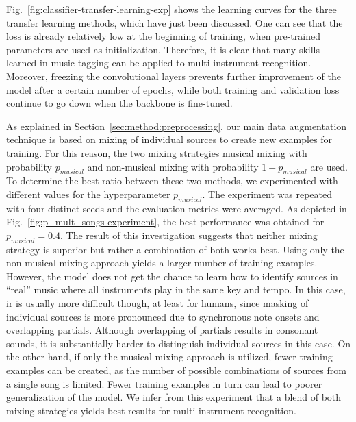 Fig.~\ref{fig:classifier-transfer-learning-exp} shows the learning curves for the three transfer learning methods, which have just been discussed. One can see that the loss is already relatively low at the beginning of training, when pre-trained parameters are used as initialization. Therefore, it is clear that many skills learned in music tagging can be applied to multi-instrument recognition. Moreover, freezing the convolutional layers prevents further improvement of the model after a certain number of epochs, while both training and validation loss continue to go down when the backbone is fine-tuned.

As explained in Section~\ref{sec:method:preprocessing}, our main data augmentation technique is based on mixing of individual sources to create new examples for training. For this reason, the two mixing strategies musical mixing with probability $p_{musical}$ and non-musical mixing with probability $1 - p_{musical}$ are used. To determine the best ratio between these two methods, we experimented with different values for the hyperparameter $p_{musical}$. The experiment was repeated with four distinct seeds and the evaluation metrics were averaged. As depicted in Fig.~\ref{fig:p_mult_songs-experiment}, the best performance was obtained for $p_{musical}=0.4$. The result of this investigation suggests that neither mixing strategy is superior but rather a combination of both works best. Using only the non-musical mixing approach yields a larger number of training examples. However, the model does not get the chance to learn how to identify sources in \enquote{real} music where all instruments play in the same key and tempo. In this case, \gls{ir} is usually more difficult though, at least for humans, since masking of individual sources is more pronounced due to synchronous note onsets and overlapping partials. Although overlapping of partials results in consonant sounds, it is substantially harder to distinguish individual sources in this case. On the other hand, if only the musical mixing approach is utilized, fewer training examples can be created, as the number of possible combinations of sources from a single song is limited. Fewer training examples in turn can lead to poorer generalization of the model. We infer from this experiment that a blend of both mixing strategies yields best results for multi-instrument recognition.

